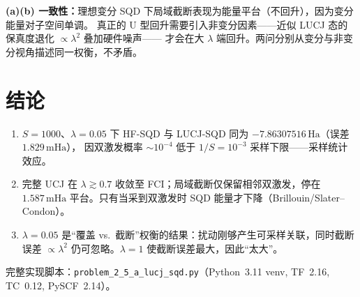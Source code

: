 \documentclass[11pt,a4paper]{article}
\newcommand{\Ha}{\,\text{Ha}}
\newcommand{\mHa}{\,\text{mHa}}
\begin{document}
\begin{keybox}
\textbf{(a)(b) 一致性：}理想变分 SQD 下局域截断表现为能量平台（不回升），因为变分能量对子空间单调。
真正的 U 型回升需要引入非变分因素——近似 LUCJ 态的保真度退化 $\propto\!\lambda^2$ 叠加硬件噪声——
才会在大 $\lambda$ 端回升。两问分别从变分与非变分视角描述同一权衡，不矛盾。
\end{keybox}

\section{结论}
\begin{enumerate}[leftmargin=*]
  \item $S=1000$、$\lambda=0.05$ 下 HF-SQD 与 LUCJ-SQD 同为 $-7.86307516\Ha$（误差 $1.829\mHa$），
  因双激发概率 $\sim\!10^{-4}$ 低于 $1/S=10^{-3}$ 采样下限——采样统计效应。
  \item 完整 UCJ 在 $\lambda\gtrsim0.7$ 收敛至 FCI；局域截断仅保留相邻双激发，停在 $1.587\mHa$
  平台。只有当采到双激发时 SQD 能量才下降（Brillouin/Slater--Condon）。
  \item $\lambda=0.05$ 是“覆盖 vs.\ 截断”权衡的结果：扰动刚够产生可采样关联，同时截断误差
  $\propto\!\lambda^2$ 仍可忽略。$\lambda=1$ 使截断误差最大，因此“太大”。
\end{enumerate}

\vspace{4pt}
{\small 完整实现脚本：\texttt{problem\_2\_5\_a\_lucj\_sqd.py}（Python~3.11 venv, TF~2.16,
TC~0.12, PySCF~2.14）。}
\end{document}
